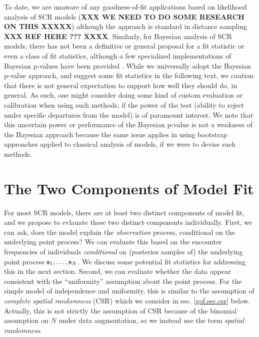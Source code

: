 To date, we are unaware of any goodness-of-fit applications based on
likelihood analysis of SCR models ({\bf XXX WE NEED TO DO SOME
  RESEARCH ON THIS XXXXX}) although the approach is standard in
distance sampling {\bf XXX REF HERE ??? XXXX}.  Similarly, for Bayesian
analysis of SCR models, there has not been a definitive or general
proposal for a fit statistic or even a class of fit statistics,
although a few specialized implementations of Bayesian p-values have
been provided \citep{royle_etal:2009,royle_etal:2011mee,
  gopalaswamy_etal:2012ecol,gopalaswamy_etal:2012mee,russell_etal:2012}.
While we universally adopt the Bayesian p-value approach, and suggest
some fit statistics in the following text, we caution that there is
not general expectation to support how well they should do, in
general. As such, one might consider doing some kind of custom
evaluation or calibration when using such methods, if the power of the
test (ability to reject under specific departures from the model) is
of paramount interest.  We note that this uncertain power or
performance of the Bayesian p-value is not a weakness of the Bayesian
approach because the same issue applies in using bootstrap approaches
applied to classical analysis of models, if we were to devise such
methods.




\section{The Two Components of Model Fit}

For most SCR models, there are at least two distinct components of
model fit, and we propose to evlauate these two distinct components 
 individually.  First, we can ask, does the model explain the {\it
  observation} process, conditional on the underlying point process?
We can evaluate this based on the encounter frequencies of individuals
{\it conditional} on (posterior samples of) the underlying point
process ${\bf s}_{1}, \ldots, {\bf s}_{N}$.  We discuss some potential
fit statistics for addressing this in the next section.  Second, we
can evaluate whether the data appear consistent with the
``uniformity'' assumption about the point process.  For the simple
model of independence and uniformity, this is similar to the
assumption of {\it complete spatial randomness} (CSR) which we
consider in sec. \ref{gof.sec.csr} below. Actually, this is not
strictly the assumption of CSR because of the binomial assumption on
$N$ under data augmentation, so we instead use the term {\it spatial
  randomness}.


